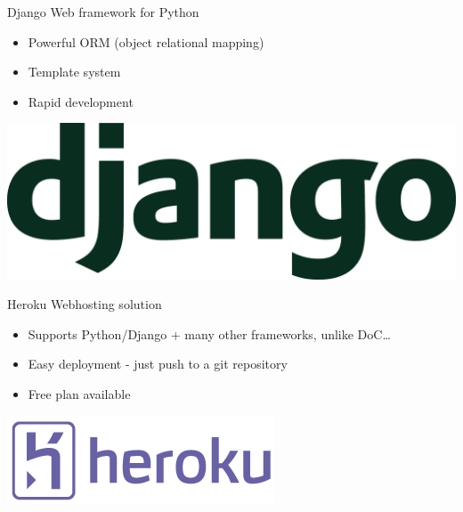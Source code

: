 \documentclass{beamer}
\begin{document}
\begin{frame}{Django}
  Web framework for Python
  \begin{itemize}
    \item Powerful ORM (object relational mapping)
    \item Template system
    \item Rapid development
  \end{itemize}
  \vspace{\baselineskip}
  \begin{center}
    \includegraphics[scale=0.05]{django.png} \\
  \end{center}
\end{frame}

\begin{frame}{Heroku}
  Webhosting solution
  \begin{itemize}
    \item Supports Python/Django + many other frameworks, unlike DoC\ldots
    \item Easy deployment - just push to a git repository
    \item Free plan available
  \end{itemize}
  \vspace{\baselineskip}
  \begin{center}
    \includegraphics[scale=0.25]{heroku.png} \\
  \end{center}
\end{frame}
\end{document}
